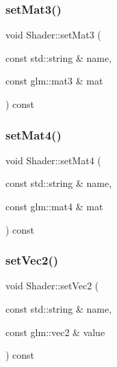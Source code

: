 \mbox{\label{classShader_a3e24fcad187493dfebaa12939072e91d}} 
\subsubsection{\texorpdfstring{set\+Mat3()}{setMat3()}}
{\footnotesize\ttfamily void Shader\+::set\+Mat3 (\begin{DoxyParamCaption}\item[{const std\+::string \&}]{name,  }\item[{const glm\+::mat3 \&}]{mat }\end{DoxyParamCaption}) const\hspace{0.3cm}{\ttfamily [inline]}}

\mbox{\label{classShader_a8e711c96f3e1722cbfb88fde9478977c}} 
\subsubsection{\texorpdfstring{set\+Mat4()}{setMat4()}}
{\footnotesize\ttfamily void Shader\+::set\+Mat4 (\begin{DoxyParamCaption}\item[{const std\+::string \&}]{name,  }\item[{const glm\+::mat4 \&}]{mat }\end{DoxyParamCaption}) const\hspace{0.3cm}{\ttfamily [inline]}}

\mbox{\label{classShader_afd4d41322a1cdd1d5155bf124d19debf}} 
\subsubsection{\texorpdfstring{set\+Vec2()}{setVec2()}\hspace{0.1cm}{\footnotesize\ttfamily [1/2]}}
{\footnotesize\ttfamily void Shader\+::set\+Vec2 (\begin{DoxyParamCaption}\item[{const std\+::string \&}]{name,  }\item[{const glm\+::vec2 \&}]{value }\end{DoxyParamCaption}) const\hspace{0.3cm}{\ttfamily [inline]}}

